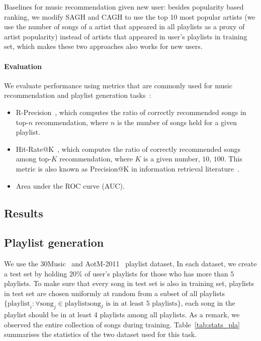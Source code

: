 Baselines for music recommendation given new user:
besides popularity based ranking, we modify SAGH and CAGH to use the top 10 most popular artists
(we use the number of songs of a artist that appeared in all playlists as a proxy of artist popularity)
instead of artists that appeared in user's playlists in training set,
which makes these two approaches also works for new users.


\paragraph{Evaluation}
We evaluate performance using metrics that are commonly used for music recommendation and playlist generation
tasks~\cite{hariri2012context,bonnin2013evaluating,jannach2015beyond,ben2017groove,schedl2017}:
\begin{itemize}
\item R-Precision~\cite{manning2008introIR}, which computes the ratio of correctly recommended songs in top-$n$ recommendation, 
      where $n$ is the number of songs held for a given playlist.
\item Hit-Rate@K~\cite{hariri2012context}, which computes the ratio of correctly recommended songs among top-$K$ recommendation, 
      where $K$ is a given number, \eg $10$, $100$. 
      This metric is also known as Precision@K in information retrieval literature~\cite{manning2008introIR}.
\item Area under the ROC curve (AUC).
\end{itemize}



\subsection{Results}

\subsection{Playlist generation}
\label{ssec:pla}

We use the 30Music~\cite{30music2015} and AotM-2011~\cite{mcfee2012hypergraph} playlist dataset,
In each dataset, we create a test set by holding 20\% of user's playlists for those who has more than $5$ playlists.
To make sure that every song in test set is also in training set, 
playlists in test set are chosen uniformly at random from a subset of all playlists 
$\{\text{playlist}_i: \forall \text{song}_j \in \text{playlist} \text{song$_j$ is in at least $5$ playlists}\}$,
\ie each song in the playlist should be in at least 4 playlists among all playlists.
As a remark, we observed the entire collection of songs during training.
Table~\ref{tab:stats_pla} summarises the statistics of the two dataset used for this task.

